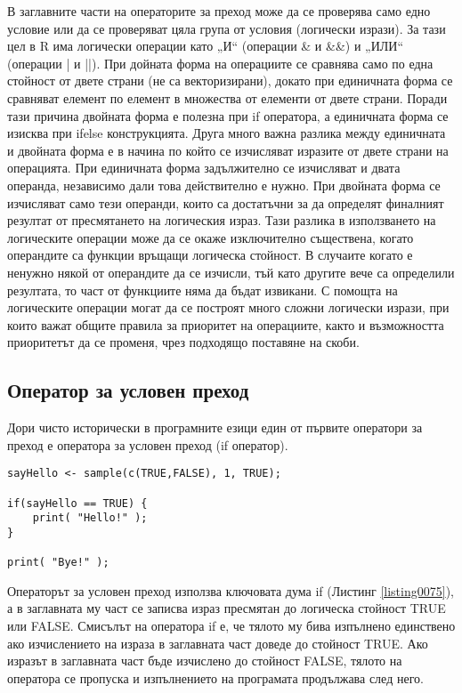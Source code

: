 В заглавните части на операторите за преход може да се проверява само едно условие или да се проверяват цяла група от условия (логически изрази). За тази цел в R има логически операции като „И“ (операции \& и \&\&) и „ИЛИ“ (операции | и ||). При дойната форма на операциите се сравнява само по една стойност от двете страни (не са векторизирани), докато при единичната форма се сравняват елемент по елемент в множества от елементи от двете страни. Поради тази причина двойната форма е полезна при if оператора, а единичната форма се изисква при ifelse конструкцията. Друга много важна разлика между единичната и двойната форма е в начина по който се изчисляват изразите от двете страни на операцията. При единичната форма задължително се изчисляват и двата операнда, независимо дали това действително е нужно. При двойната форма се изчисляват само тези операнди, които са достатъчни за да определят финалният резултат от пресмятането на логическия израз. Тази разлика в използването на логическите операции може да се окаже изключително съществена, когато операндите са функции връщащи логическа стойност. В случаите когато е ненужно някой от операндите да се изчисли, тъй като другите вече са определили резултата, то част от функциите няма да бъдат извикани. С помощта на логическите операции могат да се построят много сложни логически изрази, при които важат общите правила за приоритет на операциите, както и възможността приоритетът да се променя, чрез подходящо поставяне на скоби. 

\subsection{Оператор за условен преход}

Дори чисто исторически в програмните езици един от първите оператори за преход е оператора за условен преход (if оператор). 

\begin{lstlisting}[caption=Оператор за условен преход if, label=listing0075]
sayHello <- sample(c(TRUE,FALSE), 1, TRUE);

if(sayHello == TRUE) {
	print( "Hello!" );
}

print( "Bye!" );
\end{lstlisting}

Операторът за условен преход използва ключовата дума if (Листинг \ref{listing0075}), а в заглавната му част се записва израз пресмятан до логическа стойност TRUE или FALSE. Смисълът на оператора if е, че тялото му бива изпълнено единствено ако изчислението на израза в заглавната част доведе до стойност TRUE. Ако изразът в заглавната част бъде изчислено до стойност FALSE, тялото на оператора се пропуска и изпълнението на програмата продължава след него.

